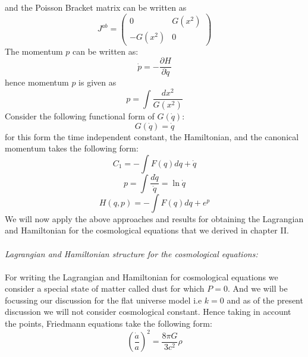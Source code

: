 \documentclass[14pt]{extarticle}
\begin{document}
and the Poisson Bracket matrix can be written as \\
\begin{equation}
J^{a b}=\left( \begin{array}{cc}{0} & {G\left(x^{2}\right)} \\ {-G\left(x^{2}\right)} & {0}\end{array}\right)
\end{equation}
The momentum $p$ can be written as:\\
\begin{equation}
\dot{p}=-\frac{\partial H}{\partial \dot{q}}
\end{equation}
hence momentum $p$ is given as\\
\begin{equation}
p=\int \frac{d x^{2}}{G\left(x^{2}\right)}
\end{equation}
Consider the following functional form of $G(\dot{q})$:\\
\begin{equation}
G(\dot{q})=\dot{q}
\end{equation}
for this form the time independent constant, the Hamiltonian, and the canonical momentum takes the following form:\\
\begin{equation}
C_{1}=-\int F(q) d q+\dot{q}
\end{equation}
\begin{equation}
p=\int \frac{d \dot{q}}{\dot{q}}=\ln \dot{q}
\end{equation}
\begin{equation}
H(q, p)=-\int F(q) d q+e^{p}
\end{equation}
We will now apply the above approaches and results for obtaining the Lagrangian and Hamiltonian for the cosmological equations that we derived in chapter II.\\ \\
\textit{Lagrangian and Hamiltonian structure for the cosmological equations:}\\ \\
For writing the Lagrangian and Hamiltonian for cosmological equations we consider a special state of matter called dust for which $P=0$. And we will be focussing our discussion for the flat universe model i.e $k=0$ and  as of the present discussion we will not consider cosmological constant. Hence taking in account the points, Friedmann equations take the following form:
\begin{equation}
\left(\frac{\dot{a}}{a}\right)^{2}=\frac{8 \pi G}{3 c^{2}} \rho
\end{equation}
\end{document}
